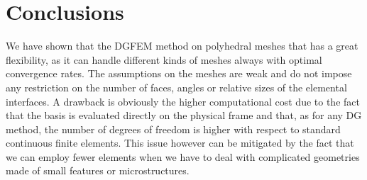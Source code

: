\documentclass[12pt, a4paper]{article}
\theoremstyle{definition}
\theoremstyle{plain}
\theoremstyle{plain}
\theoremstyle{definition}
\begin{document}
\section{Conclusions}\label{sec:conc}
We have shown that the DGFEM method on polyhedral meshes that has a great 
flexibility, as it can handle different kinds of meshes always with 
optimal convergence rates. The assumptions on the meshes are weak and do not 
impose any restriction on the number of faces, angles or relative sizes of the 
elemental interfaces. A drawback is obviously the higher computational cost due 
to the fact that the basis is evaluated directly on the 
physical frame and that, as for any DG method, the number of degrees of 
freedom is higher with respect to standard continuous finite elements. This 
issue however can be mitigated by the fact that we can employ fewer elements 
when we have to deal with complicated geometries made of small features or 
microstructures.\\
\end{document}
